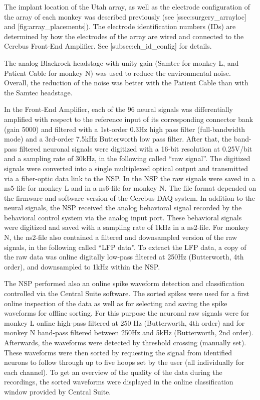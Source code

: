 {The implant location of the Utah array, as well as the electrode configuration of the array of each monkey was described previously (see [ssec:surgery\_arrayloc] and [fig:array\_placements]). The electrode identification numbers (IDs) are determined by how the electrodes of the array are wired and connected to the Cerebus Front-End Amplifier. See [subsec:ch\_id\_config] for details.

The analog Blackrock headstage with unity gain (Samtec for monkey L, and Patient Cable for monkey N) was used to reduce the environmental noise. Overall, the reduction of the noise was better with the Patient Cable than with the Samtec headstage.

In the Front-End Amplifier, each of the 96 neural signals was differentially amplified with respect to the reference input of its corresponding connector bank (gain 5000) and filtered with a 1st-order 0.3Hz high pass filter (full-bandwidth mode) and a 3rd-order 7.5kHz Butterworth low pass filter. After that, the band-pass filtered neuronal signals were digitized with a 16-bit resolution at 0.25V/bit and a sampling rate of 30kHz, in the following called “raw signal”. The digitized signals were converted into a single multiplexed optical output and transmitted via a fiber-optic data link to the NSP. In the NSP the raw signals were saved in a ns5-file for monkey L and in a ns6-file for monkey N. The file format depended on the firmware and software version of the Cerebus DAQ system. In addition to the neural signals, the NSP received the analog behavioral signal recorded by the behavioral control system via the analog input port. These behavioral signals were digitized and saved with a sampling rate of 1kHz in a ns2-file. For monkey N, the ns2-file also contained a filtered and downsampled version of the raw signals, in the following called “LFP data”. To extract the LFP data, a copy of the raw data was online digitally low-pass filtered at 250Hz (Butterworth, 4th order), and downsampled to 1kHz within the NSP.

The NSP performed also an online spike waveform detection and classification controlled via the Central Suite software. The sorted spikes were used for a first online inspection of the data as well as for selecting and saving the spike waveforms for offline sorting. For this purpose the neuronal raw signals were for monkey L online high-pass filtered at 250 Hz (Butterworth, 4th order) and for monkey N band-pass filtered between 250Hz and 5kHz (Butterworth, 2nd order). Afterwards, the waveforms were detected by threshold crossing (manually set). These waveforms were then sorted by requesting the signal from identified neurons to follow through up to five hoops set by the user (all individually for each channel). To get an overview of the quality of the data during the recordings, the sorted waveforms were displayed in the online classification window provided by Central Suite.

}
